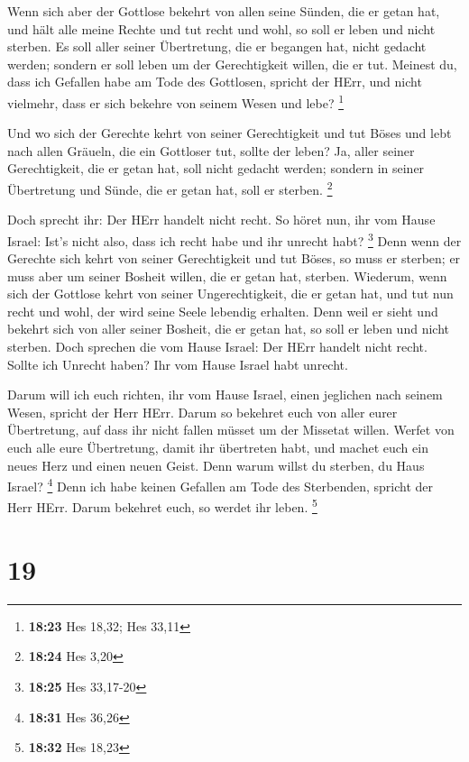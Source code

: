  Wenn sich aber der Gottlose bekehrt von allen seine
Sünden, die er getan hat, und hält alle meine Rechte und tut recht und
wohl, so soll er leben und nicht sterben.  Es soll aller
seiner Übertretung, die er begangen hat, nicht gedacht werden; sondern
er soll leben um der Gerechtigkeit willen, die er tut. 
Meinest du, dass ich Gefallen habe am Tode des Gottlosen, spricht der
HErr, und nicht vielmehr, dass er sich bekehre von seinem Wesen und
lebe? \footnote{\textbf{18:23} Hes 18,32; Hes 33,11}

 Und wo sich der Gerechte kehrt von seiner Gerechtigkeit
und tut Böses und lebt nach allen Gräueln, die ein Gottloser tut, sollte
der leben? Ja, aller seiner Gerechtigkeit, die er getan hat, soll nicht
gedacht werden; sondern in seiner Übertretung und Sünde, die er getan
hat, soll er sterben. \footnote{\textbf{18:24} Hes 3,20}

 Doch sprecht ihr: Der HErr handelt nicht recht. So höret
nun, ihr vom Hause Israel: Ist's nicht also, dass ich recht habe und ihr
unrecht habt? \footnote{\textbf{18:25} Hes 33,17-20}  Denn
wenn der Gerechte sich kehrt von seiner Gerechtigkeit und tut Böses, so
muss er sterben; er muss aber um seiner Bosheit willen, die er getan
hat, sterben.  Wiederum, wenn sich der Gottlose kehrt von
seiner Ungerechtigkeit, die er getan hat, und tut nun recht und wohl,
der wird seine Seele lebendig erhalten.  Denn weil er sieht
und bekehrt sich von aller seiner Bosheit, die er getan hat, so soll er
leben und nicht sterben.  Doch sprechen die vom Hause
Israel: Der HErr handelt nicht recht. Sollte ich Unrecht haben? Ihr vom
Hause Israel habt unrecht.

 Darum will ich euch richten, ihr vom Hause Israel, einen
jeglichen nach seinem Wesen, spricht der Herr HErr. Darum so bekehret
euch von aller eurer Übertretung, auf dass ihr nicht fallen müsset um
der Missetat willen.  Werfet von euch alle eure
Übertretung, damit ihr übertreten habt, und machet euch ein neues Herz
und einen neuen Geist. Denn warum willst du sterben, du Haus Israel?
\footnote{\textbf{18:31} Hes 36,26}  Denn ich habe keinen
Gefallen am Tode des Sterbenden, spricht der Herr HErr. Darum bekehret
euch, so werdet ihr leben. \footnote{\textbf{18:32} Hes 18,23}

\hypertarget{section-6}{%
\section{19}\label{section-6}}

